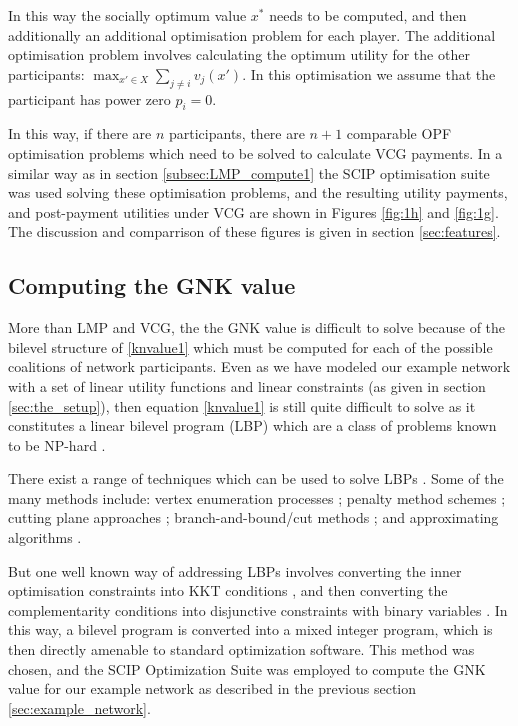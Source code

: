 In this way the socially optimum value $x^*$ needs to be computed, and then additionally an additional optimisation problem for each player.
The additional optimisation problem involves calculating the optimum utility for the other participants: $\max_{x'\in X}\sum_{j\ne i}v_j(x')$.
In this optimisation we assume that the participant has power zero $p_i=0$.

In this way, if there are $n$ participants, there are $n+1$ comparable OPF optimisation problems which need to be solved to calculate VCG payments.
In a similar way as in section \ref{subsec:LMP_compute1} the SCIP optimisation suite was used solving these optimisation problems, and the resulting utility payments, and post-payment utilities under VCG are shown in Figures \ref{fig:1h} and \ref{fig:1g}.
The discussion and comparrison of these figures is given in section \ref{sec:features}.


\subsection{Computing the GNK value}\label{subsec:gnk_compute1}

More than LMP and VCG, the the GNK value is difficult to solve because of the bilevel structure of \eqref{knvalue1} which must be computed for each of the possible coalitions of network participants.
Even as we have modeled our example network with a set of linear utility functions and linear constraints (as given in section \ref{sec:the_setup}), then equation \eqref{knvalue1} is still quite difficult to solve as it constitutes a linear bilevel program (LBP) which are a class of problems known to be NP-hard \cite{DBLP:journals/tec/SinhaMD18,Ben-Ayed:1990:CDB}.

There exist a range of techniques which can be used to solve LBPs \cite{DBLP:journals/tec/SinhaMD18,S.Dempe.Optimisations}.
Some of the many methods include: vertex enumeration processes \cite{Bialas:1984:TLP:2784019.2784026,Shi:2005:EKA:2641854.2642183,LIU1995644,article_cutting_plane}; penalty method schemes \cite{KleinertSchmidt2019,ONAL1993126,dempe_optimisation111};
cutting plane approaches \cite{cuttingplane1};
branch-and-bound/cut methods \cite{SHI200551,Hansen:1992:NBR:141164.141181,Audet2007};
and approximating algorithms \cite{Pineda2018,rnnlbp1,genetic_algirthm_blp}.

But one well known way of addressing LBPs involves converting the inner optimisation constraints into KKT conditions \cite{kuhn1951nonlinear}, and then converting the complementarity conditions into disjunctive constraints with binary variables \cite{Fortuny-Amat1981,Pineda2018}.
In this way, a bilevel program is converted into a mixed integer program, which is then directly amenable to standard optimization software.
This method was chosen, and the SCIP Optimization Suite was employed to compute the GNK value for our example network as described in the previous section \ref{sec:example_network}.

